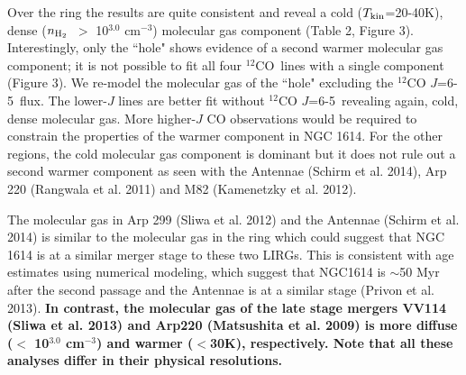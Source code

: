 \documentclass[preprint, 11pt]{aastex}
\newcommand{\co}{$^{12}$CO}
\newcommand{\cosix}{$^{12}$CO $J$=6-5}
\newcommand{\tkin}{$T_{\rm{kin}}$}
\newcommand{\nhtwo}{$n_{\rm{H_{2}}}$}
\begin{document}
Over the ring the results are quite consistent and reveal a cold (\tkin=20-40K), dense (\nhtwo\ $>$ 10$^{3.0}$ cm$^{-3}$) molecular gas component (Table 2, Figure 3). Interestingly, only the ``hole" shows evidence of a second warmer molecular gas component; it is not possible to fit all four \co\ lines with a single component (Figure 3). We re-model the molecular gas of the ``hole" excluding the \cosix\ flux. The lower-$J$ lines are better fit without \cosix\ revealing again, cold, dense molecular gas. More higher-$J$ CO observations would be required to constrain the properties of the warmer component in NGC 1614. For the other regions, the cold molecular gas component is dominant but it does not rule out a second warmer component as seen with the Antennae (Schirm et al. 2014), Arp 220 (Rangwala et al. 2011) and M82 (Kamenetzky et al. 2012).


The molecular gas in Arp 299 (Sliwa et al. 2012) and the Antennae (Schirm et al. 2014) is similar to the molecular gas in the ring which could suggest that NGC 1614 is at a similar merger stage to these two LIRGs. This is consistent with age estimates using numerical modeling, which suggest that NGC1614 is $\sim$50 Myr after the second passage \citep{Vaisanen2012} and the Antennae is at a similar stage (Privon et al. 2013)\nocite{Privon2013}. \textbf{In contrast, the molecular gas of the late stage mergers VV114 (Sliwa et al. 2013) and Arp220 (Matsushita et al. 2009)\nocite{Matsushita2009} is more diffuse ($<$ 10$^{3.0}$ cm$^{-3}$) and warmer ($<$30K), respectively. Note that all these analyses differ in their physical resolutions.}
\end{document}
